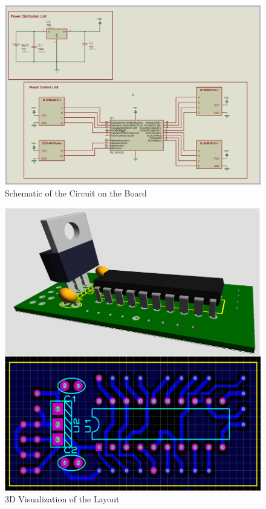 \begin{figure}[H]
\caption{Schematic of the Circuit on the Board} \label{sematik_ref}
\centerline{\includegraphics[scale = 0.40]{sematik}}
\end{figure} 

\begin{figure}[H]
\caption{3D Visualization of the Layout} \label{layout_ref}
\centerline{\includegraphics[scale = 0.60]{sematik-layout}}
\end{figure} 

